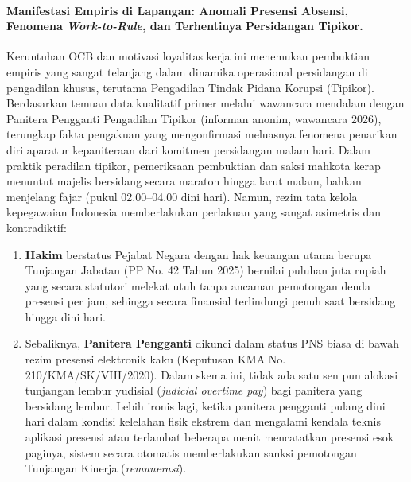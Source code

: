 \documentclass[12pt, a4paper]{article}
\begin{document}
\paragraph{Manifestasi Empiris di Lapangan: Anomali Presensi Absensi, Fenomena \textit{Work-to-Rule}, dan Terhentinya Persidangan Tipikor.}
Keruntuhan OCB dan motivasi loyalitas kerja ini menemukan pembuktian empiris yang sangat telanjang dalam dinamika operasional persidangan di pengadilan khusus, terutama Pengadilan Tindak Pidana Korupsi (Tipikor). Berdasarkan temuan data kualitatif primer melalui wawancara mendalam dengan Panitera Pengganti Pengadilan Tipikor (informan anonim, wawancara 2026), terungkap fakta pengakuan yang mengonfirmasi meluasnya fenomena penarikan diri aparatur kepaniteraan dari komitmen persidangan malam hari. Dalam praktik peradilan tipikor, pemeriksaan pembuktian dan saksi mahkota kerap menuntut majelis bersidang secara maraton hingga larut malam, bahkan menjelang fajar (pukul 02.00--04.00 dini hari). Namun, rezim tata kelola kepegawaian Indonesia memberlakukan perlakuan yang sangat asimetris dan kontradiktif:
\begin{enumerate}
    \item \textbf{Hakim} berstatus Pejabat Negara dengan hak keuangan utama berupa Tunjangan Jabatan (PP No. 42 Tahun 2025) bernilai puluhan juta rupiah yang secara statutori melekat utuh tanpa ancaman pemotongan denda presensi per jam, sehingga secara finansial terlindungi penuh saat bersidang hingga dini hari.
    \item Sebaliknya, \textbf{Panitera Pengganti} dikunci dalam status PNS biasa di bawah rezim presensi elektronik kaku (Keputusan KMA No. 210/KMA/SK/VIII/2020). Dalam skema ini, tidak ada satu sen pun alokasi tunjangan lembur yudisial (\textit{judicial overtime pay}) bagi panitera yang bersidang lembur. Lebih ironis lagi, ketika panitera pengganti pulang dini hari dalam kondisi kelelahan fisik ekstrem dan mengalami kendala teknis aplikasi presensi atau terlambat beberapa menit mencatatkan presensi esok paginya, sistem secara otomatis memberlakukan sanksi pemotongan Tunjangan Kinerja (\textit{remunerasi}).
\end{enumerate}
\end{document}
